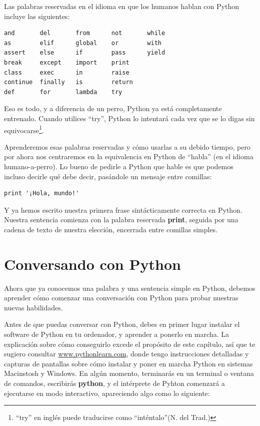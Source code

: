 Las palabras reservadas en el idioma en que los humanos hablan con
Python incluye las siguientes:

\beforeverb
\begin{verbatim}
and       del       from      not       while    
as        elif      global    or        with     
assert    else      if        pass      yield    
break     except    import    print              
class     exec      in        raise              
continue  finally   is        return             
def       for       lambda    try
\end{verbatim}
\afterverb
%
Eso es todo, y a diferencia de un perro, Python ya está completamente entrenado.
Cuando utilices ``try'', Python lo intentará cada vez que se lo digas sin
equivocarse\footnote{``try'' en inglés puede traducirse como ``inténtalo''(N. del Trad.)}.

Aprenderemos esas palabras reservadas y cómo usarlas a su debido tiempo,
pero por ahora nos centraremos en la equivalencia en Python de ``habla''
(en el idioma humano-a-perro). Lo bueno de pedirle a Python que hable
es que podemos incluso decirle qué debe decir, pasándole un mensaje entre comillas:

\beforeverb
\begin{verbatim}
print '¡Hola, mundo!'
\end{verbatim}
\afterverb

Y ya hemos escrito nuestra primera frase sintácticamente correcta en Python.
Nuestra sentencia comienza con la palabra reservada {\bf print}, seguida
por una cadena de texto de nuestra elección, encerrada entre comillas simples.

\section{Conversando con Python}

Ahora que ya conocemos una palabra y una sentencia simple en Python,
debemos aprender cómo comenzar una conversación con Python para probar
nuestras nuevas habilidades.

Antes de que puedas conversar con Python, debes en primer lugar instalar
el software de Python en tu ordenador, y aprender a ponerlo en marcha.
La explicación sobre cómo conseguirlo excede el propósito de este capítulo,
así que te sugiero consultar \url{www.pythonlearn.com}, donde tengo
instrucciones detalladas y capturas de pantallas sobre cómo instalar y poner en marcha
Python en sistemas Macinstosh y Windows. En algún momento, terminarás en un terminal
o ventana de comandos, escribirás {\bf python}, y el intérprete de Pyhton
comenzará a ejecutarse en modo interactivo, apareciendo algo como lo siguiente:

